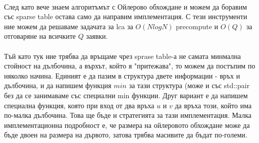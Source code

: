 \documentclass[12pt]{article}
\begin{document}
\paragraph*{}
След като вече знаем алгоритъмът с Ойлерово обхождане и можем да боравим със sparse table остава само да направим имплементация. С тези инструменти ние можем да решаваме задачата за lca за $O(N logN)$ precompute и $O(Q)$ за отговаряне на всичките $Q$ заявки.
\paragraph*{}
Тъй като тук ние трябва да връщаме чрез sprase table-а не самата минмална стойност на дълбочина, а  върхът, който я "притежава", то можем да постъпим по няколко начина. Единият е да пазим в структура двете информации - връх и дълбочина, и да напишем функция $min$ за тази структура (може и със std::pair без да се занимаваме със специални min функции. Друг вариант е да напишем специална функция, която при вход от два връха $u$ и $v$ да връха този, който има по-малка дълбочина. Това ще бъде и стратегията за тази имплементация. Малка имплементационна подробност е, че размера на ойлеровото обхождане може да бъде двоен на размера на дървото, затова трябва масивите да бъдат по-големи.
\end{document}
